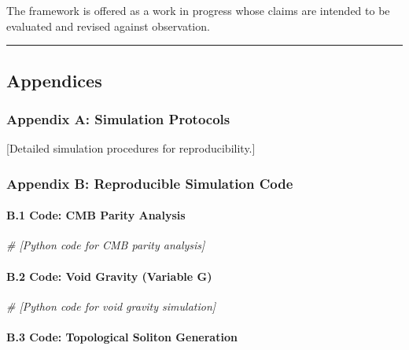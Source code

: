 \documentclass[
]{article}
\newenvironment{Shaded}{}{}
\newcommand{\CommentTok}[1]{\textcolor[rgb]{0.38,0.63,0.69}{\textit{#1}}}
\begin{document}
The framework is offered as a work in progress whose claims are intended
to be evaluated and revised against observation.

\begin{center}\rule{0.5\linewidth}{0.5pt}\end{center}

\subsection{Appendices}\label{appendices}

\subsubsection{Appendix A: Simulation
Protocols}\label{appendix-a-simulation-protocols}

{[}Detailed simulation procedures for reproducibility.{]}

\subsubsection{Appendix B: Reproducible Simulation
Code}\label{appendix-b-reproducible-simulation-code}

\paragraph{B.1 Code: CMB Parity
Analysis}\label{b.1-code-cmb-parity-analysis}

\begin{Shaded}
\begin{Highlighting}[]
\CommentTok{\# [Python code for CMB parity analysis]}
\end{Highlighting}
\end{Shaded}

\paragraph{B.2 Code: Void Gravity (Variable
G)}\label{b.2-code-void-gravity-variable-g}

\begin{Shaded}
\begin{Highlighting}[]
\CommentTok{\# [Python code for void gravity simulation]}
\end{Highlighting}
\end{Shaded}

\paragraph{B.3 Code: Topological Soliton
Generation}\label{b.3-code-topological-soliton-generation}
\end{document}
